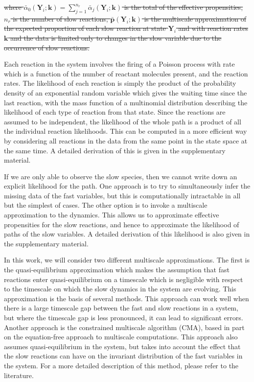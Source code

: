 \documentclass[final]{siamltex}
\newcommand{\edit}[1]{{\color{red} #1}}  %
\providecommand{\DIFdel}[1]{{\protect\color{red}\sout{#1}}}                      %
\providecommand{\DIFaddbegin}{} %
\providecommand{\DIFdelend}{} %
\newcommand{\DIFaddincludegraphics}[2][]{{\color{blue}\fbox{\DIFOincludegraphics[#1]{#2}}}} %
\DeclareRobustCommand{\DIFaddbegin}{\DIFOaddbegin \let\includegraphics\DIFaddincludegraphics} %
\DeclareRobustCommand{\DIFdelend}{\DIFOaddend \let\includegraphics\DIFOincludegraphics} %
\begin{document}
\DIFdel{where $\bar{\alpha}_0(\mathbf{Y}_i; \mathbf{k}) = \sum_{j=1}^{n_r}
\bar{\alpha}_j(\mathbf{Y}_i; \mathbf{k})$ is the total of the
effective propensities, $n_r$ is the number of slow reactions,
$\bar{\mathbf{p}}(\mathbf{Y}_i; \mathbf{k})$ is the multiscale
approximation of the expected proportion of each slow reaction at
state $\mathbf{Y}_i$ and with reaction rates $\mathbf{k}$ and the
data is limited only to changes in the slow variable due to the
occurrence of slow reactions.
}\DIFdelend \DIFaddbegin \edit{Each reaction in the system involves the firing
  of a Poisson process with rate which is a function of the number of
  reactant molecules present, and the reaction rates. The likelihood
  of each reaction is simply the product of the probability density of
  an exponential random
  variable which gives the waiting time since the last reaction, with
  the mass function of a
  multinomial distribution describing the likelihood of each type of
  reaction from that state. Since the
  reactions are assumed to be independent, the likelihood of the whole
  path is a product of all the individual reaction likelihoods. This
  can be computed in a more efficient way by considering all reactions
  in the data from the same point in the state space at the same
  time. A detailed derivation of this is given in the
  supplementary material.

If we are only able to observe the slow species, then we cannot write
down an explicit likelihood for the path. One approach is to try to
simultaneously infer the
missing data of the fast variables, but this is computationally
intractable in all but the simplest of cases. The other option is to
invoke a multiscale approximation to the dynamics. This allows us to
approximate effective propensities for the slow reactions, and hence
to approximate the likelihood of paths of the slow variables. A
detailed derivation of this likelihood is also given in the
supplementary material.

In this work, we will consider two different multiscale
approximations. The first is the quasi-equilibrium approximation
which makes the assumption that fast reactions
enter quasi-equilibrium on a timescale which is negligible with
respect to the timescale on which the slow dynamics in the system are
evolving. This approximation is the basis of several
methods\cite{weinan2007nested,cao2005slow}. This approach can work well when there is a large timescale gap
between the fast and slow reactions in a system, but where the
timescale gap is less pronounced, it can lead to significant
errors\cite{cotter2016error}. Another approach is the
constrained multiscale algorithm (CMA)\cite{cotter2011constrained,cotter2016constrained}, based in part on the
equation-free approach to multiscale computations\cite{kevrekidis2003equation,erban2006gene}. This approach also assumes quasi-equilibrium in the
system, but takes into account the effect that the slow reactions can
have on the invariant distribution of the fast variables in the
system. For a more detailed description of this method, please refer
to the literature\cite{cotter2016constrained}.


}
\end{document}
